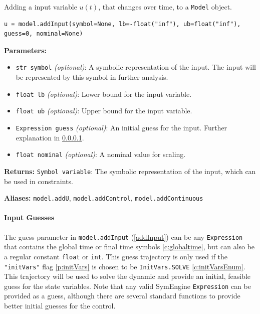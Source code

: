 \documentclass[12pt]{article}
\begin{document}
\begin{mdframed}[backgroundcolor=gray!10, roundcorner=10pt, linewidth=1pt]
	
	Adding a input variable $u(t)$, that changes over time, to a \texttt{Model} object.

	\begin{lstlisting}
u = model.addInput(symbol=None, lb=-float("inf"), ub=float("inf"), guess=0, nominal=None)
	\end{lstlisting}
	\label{addInput}
	\textbf{Parameters:}
	\begin{itemize}
		\item \texttt{str symbol} \emph{(optional)}: A symbolic representation of the input. The input will be represented by this symbol in further analysis.
		\item \texttt{float lb} \emph{(optional)}: Lower bound for the input variable.
		\item \texttt{float ub} \emph{(optional)}: Upper bound for the input variable.
		\item \texttt{Expression guess} \emph{(optional)}: An initial guess for the input. Further explanation in \ref{p:cguesses}.
		\item \texttt{float nominal} \emph{(optional)}: A nominal value for scaling.
	\end{itemize}
	
	\textbf{Returns:} 
	\texttt{Symbol variable}: The symbolic representation of the input, which can be used in constraints.
	
	\textbf{Aliases:}  \texttt{model.addU}, \texttt{model.addControl}, \texttt{model.addContinuous} 
\end{mdframed}

	\paragraph{Input Guesses}
	\label{p:cguesses}
	The guess parameter in \texttt{model.addInput} (\ref{addInput}) can be any \texttt{Expression} that contains the global time or final time symbols \ref{c:globaltime}, but can also be a regular constant \texttt{float} or \texttt{int}. This guess trajectory is only used if the 
	\texttt{"initVars"} flag \ref{p:initVars} is chosen to be \texttt{InitVars.SOLVE} \ref{c:initVarsEnum}. This trajectory will be used to solve the dynamic and provide an initial, feasible guess for the state variables. Note that any valid SymEngine \texttt{Expression} can be provided as a guess, although there are several standard functions to provide better initial guesses for the control.
\end{document}
